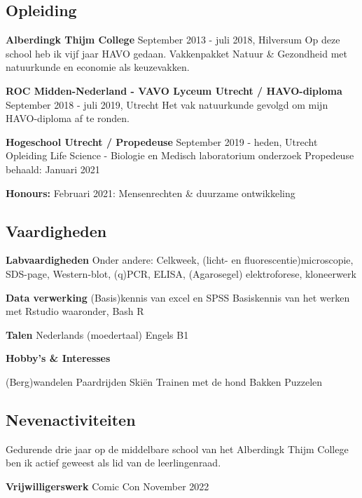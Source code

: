 \documentclass[
]{book}
\begin{document}
\hypertarget{opleiding}{%
\subsection*{Opleiding}\label{opleiding}}

\textbf{Alberdingk Thijm College}
September 2013 - juli 2018, Hilversum
Op deze school heb ik vijf jaar HAVO gedaan.
Vakkenpakket Natuur \& Gezondheid met natuurkunde en economie als keuzevakken.

\textbf{ROC Midden-Nederland - VAVO Lyceum Utrecht / HAVO-diploma}
September 2018 - juli 2019, Utrecht
Het vak natuurkunde gevolgd om mijn HAVO-diploma af te ronden.

\textbf{Hogeschool Utrecht / Propedeuse}
September 2019 - heden, Utrecht
Opleiding Life Science - Biologie en Medisch laboratorium onderzoek
Propedeuse behaald: Januari 2021

\textbf{Honours:}
Februari 2021: Mensenrechten \& duurzame ontwikkeling

\hypertarget{vaardigheden}{%
\subsection*{Vaardigheden}\label{vaardigheden}}

\textbf{Labvaardigheden}
Onder andere:
Celkweek, (licht- en fluorescentie)microscopie, SDS-page, Western-blot, (q)PCR, ELISA, (Agarosegel) elektroforese, kloneerwerk

\textbf{Data verwerking}
(Basis)kennis van excel en SPSS
Basiskennis van het werken met Rstudio waaronder,
Bash
R

\textbf{Talen}
Nederlands (moedertaal)
Engels B1

\textbf{Hobby's \& Interesses}

(Berg)wandelen
Paardrijden
Skiën
Trainen met de hond
Bakken
Puzzelen

\hypertarget{nevenactiviteiten}{%
\subsection*{Nevenactiviteiten}\label{nevenactiviteiten}}

Gedurende drie jaar op de middelbare school van het Alberdingk Thijm College ben ik actief geweest als lid van de leerlingenraad.

\textbf{Vrijwilligerswerk}
Comic Con November 2022
\end{document}
